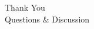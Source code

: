 \documentclass[10pt, aspectratio=169]{beamer}
\begin{document}
{
\begin{frame}[standout]
  \Huge Thank You\\[0.6cm]
  \large Questions \& Discussion
\end{frame}
}
\end{document}
